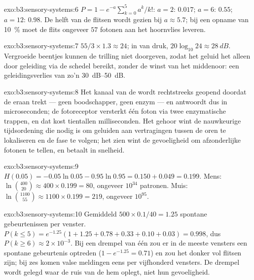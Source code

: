 \begin{solution}{exo:b3:sensory-systems:6}
$P = 1 - e^{-a}\sum_{k=0}^{5}a^{k}/k!$: $a = 2$: $0.017$; $a = 6$:
$0.55$; $a = 12$: $0.98$. De helft van de flitsen wordt gezien bij
$a \approx 5.7$; bij een opname van \qty{10}{\%} moet de flits ongeveer
$57$ fotonen aan het hoornvlies leveren.
\end{solution}

\begin{solution}{exo:b3:sensory-systems:7}
$55/3\times 1.3 \approx 24$; in  van druk, $20\log_{10}24
\approx \qty{28}{dB}$. Vergroeide beentjes kunnen de trilling niet
doorgeven, zodat het geluid het  alleen door geleiding via
de schedel bereikt, zonder de winst van het middenoor: een
geleidingsverlies van zo'n \qtyrange{30}{50}{dB}.
\end{solution}

\begin{solution}{exo:b3:sensory-systems:8}
Het kanaal van de  wordt rechtstreeks geopend doordat de
 eraan trekt --- geen boodschapper, geen enzym --- en
antwoordt dus in microseconden; de fotoreceptor versterkt één foton via
twee enzymatische trappen, en dat kost tientallen milliseconden. Het
gehoor wint de nauwkeurige tijdsordening die nodig is om geluiden aan
vertragingen tussen de oren te lokaliseren en de fase te volgen; het
zien wint de gevoeligheid om afzonderlijke fotonen te tellen, en
betaalt in snelheid.
\end{solution}

\begin{solution}{exo:b3:sensory-systems:9}
$H(0.05) = -0.05\ln 0.05 - 0.95\ln 0.95 = 0.150 + 0.049 = 0.199$.
Mens: $\ln\binom{400}{20} \approx 400\times 0.199 = 80$, ongeveer
$10^{34}$ patronen. Muis: $\ln\binom{1100}{55} \approx 1100\times 0.199
= 219$, ongeveer $10^{95}$.
\end{solution}

\begin{solution}{exo:b3:sensory-systems:10}
Gemiddeld $500\times 0.1/40 = 1.25$ spontane gebeurtenissen per
venster. $P(k
\le 5) = e^{-1.25}(1 + 1.25 + 0.78 + 0.33 + 0.10 + 0.03) = 0.998$, dus
$P(k \ge 6) \approx 2\times 10^{-3}$. Bij een drempel van één zou er in
de meeste vensters een spontane gebeurtenis optreden
($1 - e^{-1.25} = 0.71$) en zou het donker vol flitsen zijn; bij zes
komen valse meldingen eens per vijfhonderd vensters. De drempel wordt
gelegd waar de ruis van de  hem oplegt, niet hun gevoeligheid.
\end{solution}

